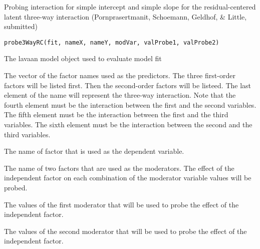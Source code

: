 \documentclass[a4paper]{book}
\begin{document}
%
\begin{Description}\relax
Probing interaction for simple intercept and simple slope for the residual-centered latent three-way interaction (Pornprasertmanit, Schoemann, Geldhof, \& Little, submitted)
\end{Description}
%
\begin{Usage}
\begin{verbatim}
probe3WayRC(fit, nameX, nameY, modVar, valProbe1, valProbe2)
\end{verbatim}
\end{Usage}
%
\begin{Arguments}
\begin{ldescription}
\item[\code{fit}] The lavaan model object used to evaluate model fit
\item[\code{nameX}] The vector of the factor names used as the predictors. The three first-order factors will be listed first. Then the second-order factors will be listeed. The last element of the name will represent the three-way interaction. Note that the fourth element must be the interaction between the first and the second variables. The fifth element must be the interaction between the first and the third variables. The sixth element must be the interaction between the second and the third variables.
\item[\code{nameY}] The name of factor that is used as the dependent variable.
\item[\code{modVar}] The name of two factors that are used as the moderators. The effect of the independent factor on each combination of the moderator variable values will be probed.
\item[\code{valProbe1}] The values of the first moderator that will be used to probe the effect of the independent factor.
\item[\code{valProbe2}] The values of the second moderator that will be used to probe the effect of the independent factor.
\end{ldescription}
\end{Arguments}
%
\end{document}
